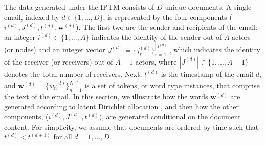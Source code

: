 \documentclass[a4paper]{article}
\begin{document}
The data generated under the IPTM consists of $D$ unique documents. A single email, indexed by $d \in \{1,...,D\}$, is represented by the four components ($i^{(d)}, J^{(d)}, t^{(d)},  \boldsymbol{w}^{(d)}$). The first two are the sender and recipients of the email: an integer $i^{(d)} \in \{1,...,A\}$ indicates the identity of the sender out of $A$ actors (or nodes) and an integer vector $J^{(d)} = \{j_r^{(d)}\}_{r=1}^{|J^{(d)}|} $, which indicates the identity of the receiver (or receivers) out of $A-1$ actors, where $|J^{(d)}|\in \{1,...,A-1\}$ denotes the total number of receivers. Next, $t^{(d)}$ is the  timestamp of the email $d$, and $\boldsymbol{w}^{(d)} = \{w^{(d)}_n \}_{n=1}^{N^{(d)}}$ is a set of tokens, or word type instances, that comprise the text of the email. In this section, we illustrate how the words $\boldsymbol{w}^{(d)}$ are generated according to latent Dirichlet allocation \citep{Blei2003}, and then how the other components, ($i^{(d)}, J^{(d)}, t^{(d)}$), are generated conditional on the document content. For simplicity, we assume that documents are ordered by time such that $t^{(d)} < t^{(d+1)}$ for all $d=1, ..., D$. 
\end{document}
